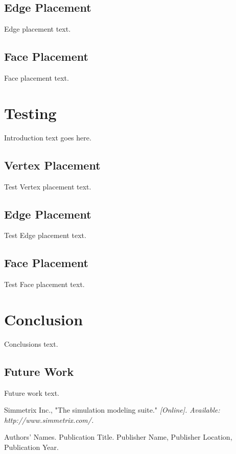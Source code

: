 \documentclass[a4paper, 12pt]{article}
\begin{document}
\subsection{Edge Placement} \label{subsec:edge}
Edge placement text.

\subsection{Face Placement} \label{subsec:face}
Face placement text.

\section{Testing} \label{sec:testing}
Introduction text goes here.

\subsection{Vertex Placement} \label{subsec:vertexTest}
Test Vertex placement text.

\subsection{Edge Placement} \label{subsec:edgeTest}
Test Edge placement text.

\subsection{Face Placement} \label{subsec:faceTest}
Test Face placement text.

\section{Conclusion} \label{sec:conclusion}
Conclusions text. 

\subsection{Future Work} \label{subsec:future}
Future work text.

\newpage
\begin{thebibliography}{99}

Simmetrix Inc., 
"The simulation modeling suite."
\textit{[Online]. Available: http://www.simmetrix.com/.}


Authors' Names. 
Publication Title.
Publisher Name, Publisher Location, Publication Year.

\end{thebibliography}
\end{document}
